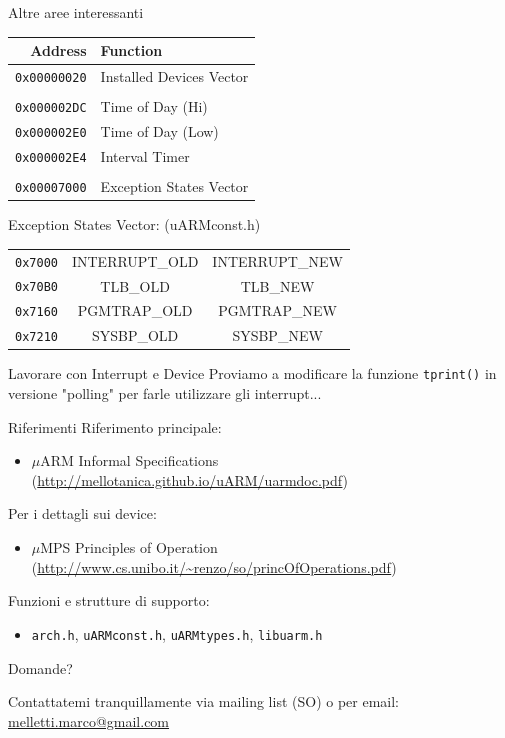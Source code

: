 \documentclass{beamer}
\begin{document}
\begin{frame}{Altre aree interessanti}
\small
\begin{tabular}{r|l}
	Address & Function \\
	\hline
	\texttt{0x00000020} & Installed Devices Vector \\
	\\
	\texttt{0x000002DC} & Time of Day (Hi) \\
	\texttt{0x000002E0} & Time of Day (Low) \\
	\texttt{0x000002E4} & Interval Timer \\
	\\
	\texttt{0x00007000} & Exception States Vector \\
\end{tabular}

\vfill

Exception States Vector: \hfill(uARMconst.h)

\vspace{5px}
\begin{tabular}{r|c|c|}
\cline{2-3}
\footnotesize\texttt{0x7000} & INTERRUPT\_OLD & INTERRUPT\_NEW \\
\cline{2-3}
\footnotesize\texttt{0x70B0} & TLB\_OLD & TLB\_NEW \\
\cline{2-3}
\footnotesize\texttt{0x7160} & PGMTRAP\_OLD & PGMTRAP\_NEW \\
\cline{2-3}
\footnotesize\texttt{0x7210} & SYSBP\_OLD & SYSBP\_NEW \\
\cline{2-3}
\end{tabular}
\end{frame}

\begin{frame}{Lavorare con Interrupt e Device}
Proviamo a modificare la funzione \texttt{tprint()} in versione "polling" per farle utilizzare gli interrupt... 
\end{frame}

\begin{frame}{Riferimenti}
Riferimento principale:

\begin{itemize}
\item $\mu$ARM Informal Specifications \small(\url{http://mellotanica.github.io/uARM/uarmdoc.pdf})
\end{itemize}

\vfill
Per i dettagli sui device:

\begin{itemize}
\item $\mu$MPS Principles of Operation \small(\url{http://www.cs.unibo.it/~renzo/so/princOfOperations.pdf})
\end{itemize}

\vfill
Funzioni e strutture di supporto:

\begin{itemize}
\item \texttt{arch.h}, \texttt{uARMconst.h}, \texttt{uARMtypes.h}, \texttt{libuarm.h}
\end{itemize}

\end{frame}

\begin{frame}

\vfill

\center\huge Domande?

\vfill
\normalsize Contattatemi tranquillamente via mailing list (SO) o per email: \url{melletti.marco@gmail.com}

\end{frame}
\end{document}

